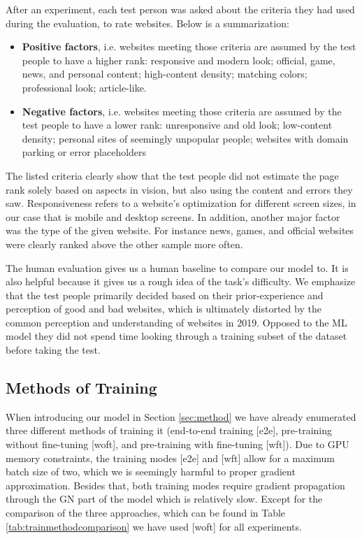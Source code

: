 After an experiment, each test person was asked about the criteria they had used during the evaluation, to rate websites. Below is a summarization:

\begin{itemize}
	\item \textbf{Positive factors}, i.e. websites meeting those criteria are assumed by the test people to have a higher rank: responsive and modern look; official, game, news, and personal content; high-content density; matching colors; professional look; article-like.
	\item \textbf{Negative factors}, i.e. websites meeting those criteria are assumed by the test people to have a lower rank: unresponsive and old look; low-content density; personal sites of seemingly unpopular people; websites with domain parking or error placeholders
\end{itemize}

The listed criteria clearly show that the test people did not estimate the page rank solely based on aspects in vision, but also using the content and errors they saw. Responsiveness refers to a website's optimization for different screen sizes, in our case that is mobile and desktop screens. In addition, another major factor was the type of the given website. For instance news, games, and official websites were clearly ranked above the other sample more often.

The human evaluation gives us a human baseline to compare our model to. It is also helpful because it gives us a rough idea of the task's difficulty. We emphasize that the test people primarily decided based on their prior-experience and perception of good and bad websites, which is ultimately distorted by the common perception and understanding of websites in 2019. Opposed to the ML model they did not spend time looking through a training subset of the dataset before taking the test.

\subsection{Methods of Training}

When introducing our model in Section \ref{sec:method} we have already enumerated three different methods of training it (end-to-end training [e2e], pre-training without fine-tuning [woft], and pre-training with fine-tuning [wft]). Due to GPU memory constraints, the training modes [e2e] and [wft] allow for a maximum batch size of two, which we is seemingly harmful to proper gradient approximation. Besides that, both training modes require gradient propagation through the GN part of the model which is relatively slow. Except for the comparison of the three approaches, which can be found in Table \ref{tab:trainmethodcomparison} we have used [woft] for all experiments.

